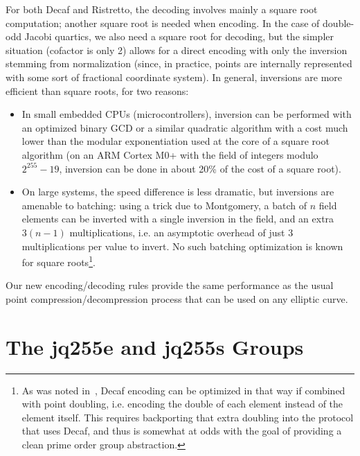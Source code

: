 \documentclass{llncs}
\begin{document}
For both Decaf and Ristretto, the decoding involves mainly a square
root computation; another square root is needed when encoding. In the
case of double-odd Jacobi quartics, we also need a square root for
decoding, but the simpler situation (cofactor is only 2) allows for a
direct encoding with only the inversion stemming from normalization
(since, in practice, points are internally represented with some sort of
fractional coordinate system). In general, inversions are more efficient
than square roots, for two reasons:
\begin{itemize}

    \item In small embedded CPUs (microcontrollers), inversion can be
    performed with an optimized binary GCD\cite{Por2020-3} or a similar
    quadratic algorithm\cite{BerYan2019} with a cost much lower than
    the modular exponentiation used at the core of a square root
    algorithm (on an ARM Cortex M0+ with the field of integers modulo
    $2^{255}-19$, inversion can be done in about 20\% of the cost of
    a square root).

    \item On large systems, the speed difference is less dramatic, but
    inversions are amenable to batching: using a trick due to
    Montgomery, a batch of $n$ field elements can be inverted with a
    single inversion in the field, and an extra $3(n-1)$
    multiplications, i.e. an asymptotic overhead of just 3
    multiplications per value to invert. No such batching optimization
    is known for square roots\footnote{As was noted in~\cite{Ham2015},
    Decaf encoding can be optimized in that way if combined with point
    doubling, i.e. encoding the double of each element instead of the
    element itself. This requires backporting that extra doubling into
    the protocol that uses Decaf, and thus is somewhat at odds with the
    goal of providing a clean prime order group abstraction.}.

\end{itemize}

Our new encoding/decoding rules provide the same performance as the
usual point compression/decompression process that can be used on any
elliptic curve.


\section{The jq255e and jq255s Groups}\label{sec:def-groups}
\end{document}
